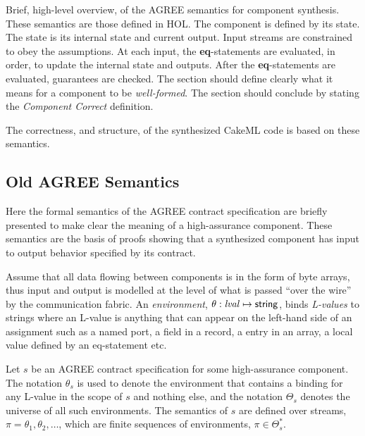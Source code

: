 Brief, high-level overview, of the AGREE semantics for component synthesis.
These semantics are those defined in HOL.
The component is defined by its state.
The state is its internal state and current output.
Input streams are constrained to obey the assumptions.
At each input, the \textbf{eq}-statements are evaluated, in order, to update the internal state and outputs.
After the \textbf{eq}-statements are evaluated, guarantees are checked.
The section should define clearly what it means for a component to be \emph{well-formed}. 
The section should conclude by stating the \emph{Component Correct} definition.

The correctness, and structure, of the synthesized CakeML code is based on these semantics.

\subsection{Old AGREE Semantics}
\label{agree-semantics}

Here the formal semantics of the AGREE contract specification are
briefly presented to make clear the meaning of a high-assurance
component.  These semantics are the basis of proofs showing that a
synthesized component has input to output behavior specified by its
contract.

Assume that all data flowing between components is in the form of byte
arrays, thus input and output is modelled at the level of what is
passed ``over the wire'' by the communication fabric. An \emph{environment},
$\theta: \mathit{lval} \mapsto \mathsf{string}$, binds \emph{L-values} to
strings where an L-value is anything that can appear on the left-hand
side of an assignment such as a named port, a field in a record, a
entry in an array, a local value defined by an eq-statement etc.

Let $s$ be an AGREE contract specification for some high-assurance
component. The notation $\theta_s$ is used to denote the environment that
contains a binding for any L-value in the scope of $s$ and nothing else, and
the notation $\Theta_s$ denotes the universe of all such environments. The
semantics of $s$ are defined over streams, $\pi = \theta_1, \theta_2, \ldots$, which
are finite sequences of environments, $\pi \in \Theta_s^*$.


